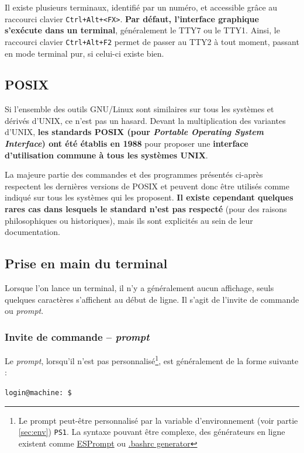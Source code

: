 Il existe plusieurs terminaux, identifié par un numéro, et accessible grâce au raccourci clavier \texttt{Ctrl+Alt+<FX>}. \textbf{Par défaut, l'interface graphique s'exécute dans un terminal}, généralement le TTY7 ou le TTY1. Ainsi, le raccourci clavier \texttt{Ctrl+Alt+F2} permet de passer au TTY2 à tout moment, passant en mode terminal pur, si celui-ci existe bien.

\vspace{-3mm}
\subsection{POSIX} \label{sec:POSIX}
\vspace{-3mm}
Si l'ensemble des outils GNU/Linux sont similaires sur tous les systèmes et dérivés d'UNIX, ce n'est pas un hasard. Devant la multiplication des variantes d'UNIX, \textbf{les standards POSIX (pour \textit{Portable Operating System Interface}) ont été établis en 1988} pour proposer une \textbf{interface d'utilisation commune à tous les systèmes UNIX}.

La majeure partie des commandes et des programmes présentés ci-après respectent les dernières versions de  POSIX et peuvent donc être utilisés comme indiqué sur tous les systèmes qui les proposent. \textbf{Il existe cependant quelques rares cas dans lesquels le standard n'est pas respecté} (pour des raisons philosophiques ou historiques), mais ils sont explicités au sein de leur documentation.
\newpage

\subsection{Prise en main du terminal}
\vspace{-4mm}
Lorsque l'on lance un terminal, il n'y a généralement aucun affichage, seuls quelques caractères s'affichent au début de ligne. Il s'agit de l'invite de commande ou \textit{prompt}.
\subsubsection{Invite de commande -- \textit{prompt}}

Le \textit{prompt}, lorsqu'il n'est pas personnalisé\footnote{Le prompt peut-être personnalisé par la variable d'environnement (voir partie \ref{sec:env}) \texttt{PS1}. La syntaxe pouvant être complexe, des générateurs en ligne existent comme \href{http://ezprompt.net}{ESPrompt} ou \href{http://bashrcgenerator.com}{.bashrc generator}}, est généralement de la forme suivante :
\begin{nscenter}
    \texttt{login@machine:\tilde~\$}
\end{nscenter}

